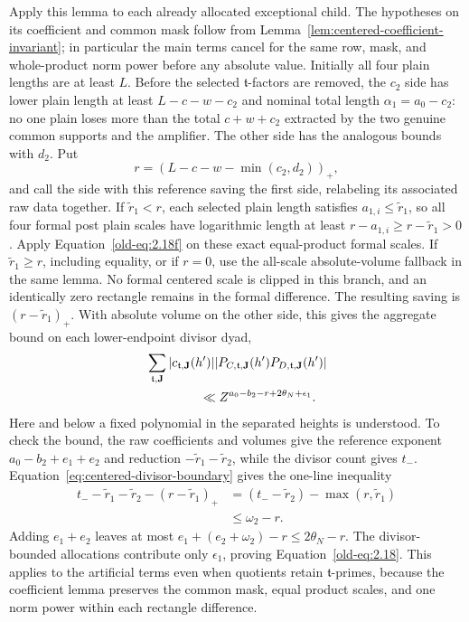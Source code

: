 \documentclass[11pt,a4paper]{article}
\numberwithin{equation}{section}
\numberwithin{figure}{section}
\theoremstyle{definition}
\theoremstyle{remark}
\begin{document}
Apply this lemma to each already allocated exceptional child.  The
hypotheses on its coefficient and common mask follow from
Lemma~\ref{lem:centered-coefficient-invariant}; in particular the
main terms cancel for the same row, mask, and whole-product norm
power before any absolute value.  Initially all four plain lengths
are at least \(L\).  Before the selected \(\mathfrak t\)-factors
are removed, the \(c_2\) side has lower plain length at least
\(L-c-w-c_2\) and nominal total length \(\alpha_1=a_0-c_2\):
no one plain loses more than the total \(c+w+c_2\) extracted by
the two genuine common supports and the amplifier.  The other side
has the analogous bounds with \(d_2\).  Put
\[
 r=(L-c-w-\min(c_2,d_2))_+,
\]
and call the side with this reference saving the first side, relabeling
its associated raw data together.  If \(\widetilde r_1<r\), each
selected plain length satisfies \(a_{1,i}\le\widetilde r_1\), so all
four formal post plain scales have logarithmic length at least
\(r-a_{1,i}\ge r-\widetilde r_1>0\).  Apply
Equation~\eqref{old-eq:2.18f} on these exact equal-product formal scales.
If \(\widetilde r_1\ge r\), including equality, or if \(r=0\), use
the all-scale absolute-volume fallback in the same lemma.  No formal
centered scale is clipped in this branch, and an identically zero
rectangle remains in the formal difference.  The resulting saving is
\((r-\widetilde r_1)_+\).  With absolute volume on the other side,
this gives the aggregate bound on each lower-endpoint divisor dyad,
\begin{equation}
 \begin{split}
 &\sum_{\mathfrak t,\mathbf J}
 |c_{\mathfrak t,\mathbf J}(h')|
 |P_{C,\mathfrak t,\mathbf J}(h')
       P_{D,\mathfrak t,\mathbf J}(h')|\\
 &\hspace{15mm}\ll
 Z^{a_0-b_2-r+2\theta_N+\epsilon_1}.
 \end{split}
 \label{old-eq:2.18}
\end{equation}
Here and below a fixed polynomial in the separated heights is
understood.  To check the bound, the raw coefficients and volumes give
the reference exponent \(a_0-b_2+e_1+e_2\) and reduction
\(-\widetilde r_1-\widetilde r_2\), while the divisor count gives
\(t_-\).  Equation~\eqref{eq:centered-divisor-boundary} gives the
one-line inequality
\begin{equation}
 \begin{split}
 t_- -\widetilde r_1-\widetilde r_2-(r-\widetilde r_1)_+
 &=(t_- -\widetilde r_2)-\max(r,\widetilde r_1)\\
 &\le\omega_2-r.
 \end{split}
 \label{old-eq:2.18h}
\end{equation}
Adding \(e_1+e_2\) leaves at most
\(e_1+(e_2+\omega_2)-r\le2\theta_N-r\).
The divisor-bounded allocations contribute only \(\epsilon_1\),
proving Equation~\eqref{old-eq:2.18}.
This applies to the artificial terms even when quotients retain
\(\mathfrak t\)-primes, because the coefficient lemma preserves the
common mask, equal product scales, and one norm power within each
rectangle difference.
\end{document}
